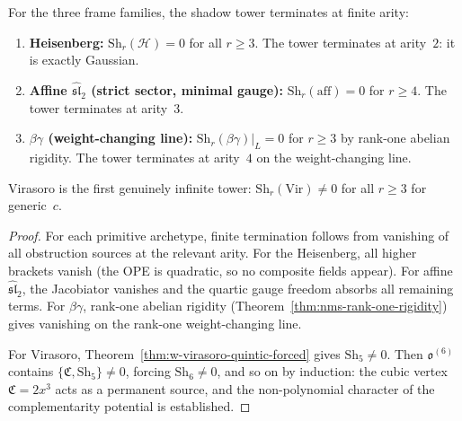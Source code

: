 \begin{theorem}
\label{thm:w-finite-termination}
For the three frame families, the shadow tower terminates at finite arity:
\begin{enumerate}[label=\textup{(\roman*)}]
\item \textbf{Heisenberg:} $\mathrm{Sh}_r(\mathcal H)=0$ for all
  $r\ge 3$.  The tower terminates at arity~$2$: it is exactly Gaussian.

\item \textbf{Affine $\widehat{\mathfrak{sl}}_2$
  \textup{(strict sector, minimal gauge):}}
  $\mathrm{Sh}_r(\mathrm{aff})=0$ for $r\ge 4$.  The tower terminates
  at arity~$3$.

\item \textbf{$\beta\gamma$ \textup{(weight-changing line):}}
  $\mathrm{Sh}_r(\beta\gamma)|_L=0$ for $r\ge 3$ by rank-one abelian
  rigidity.  The tower terminates at arity~$4$ on the
  weight-changing line.
\end{enumerate}
Virasoro is the first genuinely infinite tower:
$\mathrm{Sh}_r(\mathrm{Vir})\neq 0$ for all $r\ge 3$ for generic~$c$.
\end{theorem}

\begin{proof}
For each primitive archetype, finite termination follows from vanishing
of all obstruction sources at the relevant arity.  For the Heisenberg,
all higher brackets vanish (the OPE is quadratic, so no composite
fields appear).  For affine $\widehat{\mathfrak{sl}}_2$, the Jacobiator
vanishes and the quartic gauge freedom absorbs all remaining terms.
For $\beta\gamma$, rank-one abelian rigidity
(Theorem~\ref{thm:nms-rank-one-rigidity}) gives vanishing on the
rank-one weight-changing line.

For Virasoro, Theorem~\ref{thm:w-virasoro-quintic-forced} gives
$\mathrm{Sh}_5\neq 0$.  Then $\mathfrak o^{(6)}$ contains
$\{\mathfrak C,\mathrm{Sh}_5\}\neq 0$, forcing
$\mathrm{Sh}_6\neq 0$, and so on by induction: the cubic vertex
$\mathfrak C=2x^3$ acts as a permanent source, and the non-polynomial
character of the complementarity potential is established.\qedhere
\end{proof}

